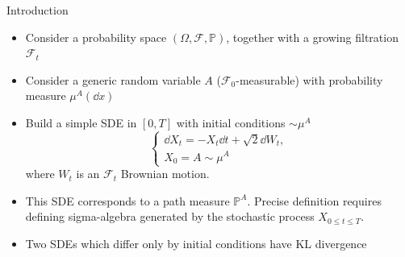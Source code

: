 \begin{frame}[allowframebreaks]{Introduction}
\begin{itemize}
\item Consider a probability space $(\Omega,\mathcal{F},\mathbb{P})$, together with a growing filtration $\mathcal{F}_t$
    \item Consider a generic random variable $A$ ($\mathcal{F}_0$-measurable) with probability measure $\mu^A(\dd x)$
    \item Build a simple SDE in $[0,T]$ with initial conditions $\sim \mu^A$
    \begin{equation}\label{eq:diffsdes}
    \begin{cases}
    \dd X_t=-X_t\dd t+\sqrt{2}\dd W_t,\\
    X_0=A\sim \mu^A
    \end{cases}
\end{equation}
where $W_t$ is an $\mathcal{F}_t$ Brownian motion.
    \item This SDE corresponds to a path measure $\mathbb{P}^{A}$. Precise definition requires defining sigma-algebra generated by the stochastic process $X_{0\leq t\leq T}$.
\item Two SDEs which differ only by initial conditions have KL divergence 


\end{itemize}
\end{frame}

